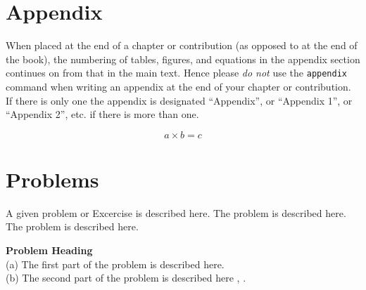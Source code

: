 \section*{Appendix}
%
When placed at the end of a chapter or contribution (as opposed to at the end of the book), the numbering of tables, figures, and equations in the appendix section continues on from that in the main text. Hence please \textit{do not} use the \verb|appendix| command when writing an appendix at the end of your chapter or contribution. If there is only one the appendix is designated ``Appendix'', or ``Appendix 1'', or ``Appendix 2'', etc. if there is more than one.

\begin{equation}
    a \times b = c
\end{equation}
\section*{Problems}
%
\begin{prob}
    \label{prob1}
    A given problem or Excercise is described here. The
    problem is described here. The problem is described here.
\end{prob}

\begin{prob}
    \label{prob2}
    \textbf{Problem Heading}\\
    (a) The first part of the problem is described here.\\
    (b) The second part of the problem is described here \cite{duchesne04}, \cite{kourti96}.
\end{prob}



